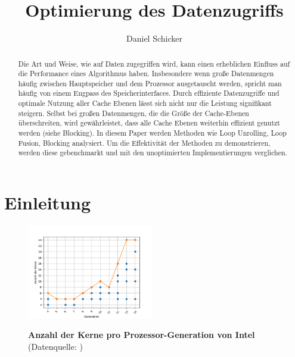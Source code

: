 \documentclass[sigconf,language=ngerman]{acmart}
\begin{document}
\title{Optimierung des Datenzugriffs}



\author{Daniel Schicker}

\begin{abstract}
    Die Art und Weise, wie auf Daten zugegriffen wird,
    kann einen erheblichen Einfluss auf die Performance eines Algorithmus haben.
    Insbesondere wenn große Datenmengen häufig zwischen Hauptspeicher und dem Prozessor ausgetauscht werden,
    spricht man häufig von einem Engpass des Speicherinterfaces.
    Durch effiziente Datenzugriffe und optimale Nutzung aller Cache Ebenen lässt 
    sich nicht nur die Leistung signifikant steigern. Selbst bei großen Datenmengen, 
    die die Größe der Cache-Ebenen überschreiten, wird gewährleistet, 
    dass alle Cache Ebenen weiterhin effizient genutzt werden (siehe Blocking). 
    In diesem Paper werden Methoden wie Loop Unrolling, Loop Fusion, Blocking analysiert.
    Um die Effektivität der Methoden zu demonstrieren, werden diese gebenchmarkt und mit den unoptimierten Implementierungen verglichen.
\end{abstract}

\maketitle

\lstset{
  basicstyle = \ttfamily,
  frame = single,
  breaklines = true,
}



\section{Einleitung}
\begin{figure}[ht]
\hspace{-0.6cm}
\caption{\textbf{Anzahl der Kerne pro Prozessor-Generation von Intel} (Datenquelle: \cite{Comparison})}
\includegraphics[width=0.49\textwidth]{Abbildung_1.png}
\label{fig:Abbildung_1}
\end{figure}
\end{document}
